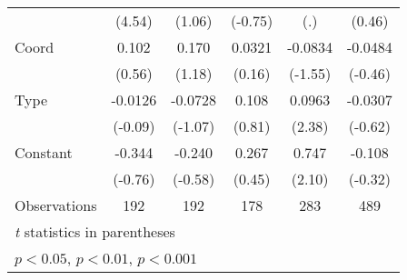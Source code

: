 {\begin{tabular}{l*{5}{c}}
                &   (4.54)         &   (1.06)         &  (-0.75)         &      (.)         &   (0.46)         \\
[1em]
Coord           &    0.102         &    0.170         &   0.0321         &  -0.0834         &  -0.0484         \\
                &   (0.56)         &   (1.18)         &   (0.16)         &  (-1.55)         &  (-0.46)         \\
[1em]
Type            &  -0.0126         &  -0.0728         &    0.108         &   0.0963\sym{*}  &  -0.0307         \\
                &  (-0.09)         &  (-1.07)         &   (0.81)         &   (2.38)         &  (-0.62)         \\
[1em]
Constant        &   -0.344         &   -0.240         &    0.267         &    0.747\sym{*}  &   -0.108         \\
                &  (-0.76)         &  (-0.58)         &   (0.45)         &   (2.10)         &  (-0.32)         \\
\hline
Observations    &      192         &      192         &      178         &      283         &      489         \\
\hline\hline
\multicolumn{6}{l}{\footnotesize \textit{t} statistics in parentheses}\\
\multicolumn{6}{l}{\footnotesize \sym{*} \(p<0.05\), \sym{**} \(p<0.01\), \sym{***} \(p<0.001\)}\\
\end{tabular}
}
